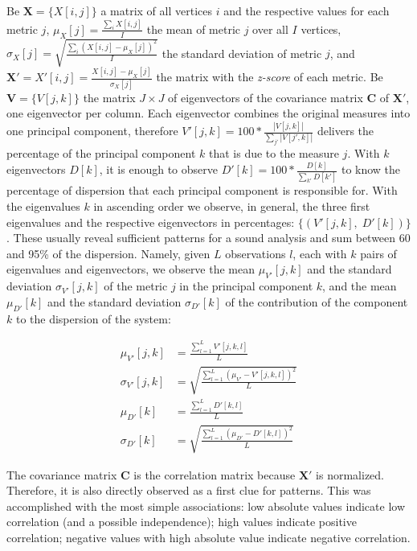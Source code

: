 \documentclass[%
	aip,
	jmp,%
	amsmath,amssymb,
	reprint,%
]{revtex4-1}
\begin{document}
Be $\mathbf{X}=\{X[i,j]\}$ a matrix of all vertices $i$ and the respective
values for each metric $j$, 
$\mu_X [j]=\frac{\sum_i X[i,j]}{I}$ the mean of metric $j$ over all $I$ vertices, 
$\sigma_X [j]=\sqrt{\frac{\sum_i (X[i,j]-\mu_X [j])^2}{I}}$ the standard deviation of metric $j$,
and $\mathbf{X'}=X'[i,j]={\frac{X[i,j]-\mu_X[j]}{\sigma_X[j]}}$ 
the matrix with the \emph{z-score} of each metric. 
Be $\mathbf{V}=\{V[j,k]\}$ the matrix $J\times J$ of eigenvectors
of the covariance matrix $\mathbf{C}$
of $\mathbf{X'}$, one eigenvector per column.
Each eigenvector combines the original measures into one principal component, therefore
$V'[j,k]=100*\frac{|V[j,k]|}{\sum_{j'} |V[j',k]|}$
delivers the percentage of the principal component $k$
that is due to the measure $j$.
With $k$ eigenvectors 
$D[k]$,
it is enough to observe $D'[k]=100*\frac{D[k]}{\sum_{k'}D[k']}$
to know the percentage of dispersion that each principal component
is responsible for.
With the eigenvalues $k$ in ascending order
we observe, in general, the three first eigenvalues and
the respective eigenvectors in percentages:
$\{(V'[j,k],\;D'[k])\}$.
These usually reveal sufficient patterns for a sound analysis and sum between 60 and 95\% of the dispersion.
Namely, given $L$ observations $l$, each with $k$ pairs of
eigenvalues and eigenvectors, we observe
the mean
$\mu_{V'}[j,k]$
and the standard deviation $\sigma_{V'}[j,k]$ 
of the metric $j$ in the principal component $k$,
and the mean
$\mu_{D'}[k]$
and the standard deviation 
$\sigma_{D'}[k]$
of the contribution of the component $k$ to the dispersion
of the system:

\begin{align}\label{eq:pca}
\mu_{V'}[j,k]   &=\frac{\sum_{l=1}^L V'[j,k,l]}{L}\nonumber\\
\sigma_{V'}[j,k]&=\sqrt{\frac{\sum_{l=1}^L (\mu_{V'}-V'[j,k,l])^2}{L}}\\\nonumber
\mu_{D'}[k]&=\frac{\sum_{l=1}^L D'[k,l]}{L}\\\nonumber
\sigma_{D'}[k]&=\sqrt{\frac{\sum_{l=1}^L (\mu_{D'}-D'[k,l])^2}{L}}
\end{align}

The covariance matrix 
$\mathbf{C}$ is the correlation matrix because $\mathbf{X'}$ is normalized. Therefore, it is also directly observed as a first clue for patterns.
This was accomplished with the most simple associations:
low absolute values indicate low correlation (and a possible independence);
high values indicate positive correlation; negative values with high absolute value indicate negative correlation.
\end{document}
